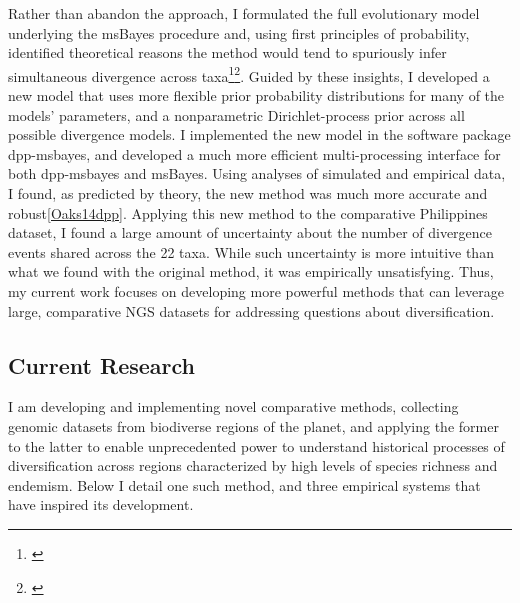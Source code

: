 Rather than abandon the approach, I formulated the full evolutionary model
underlying the msBayes procedure and, using first 
principles of probability, identified theoretical reasons the method
would tend to spuriously infer simultaneous divergence across
taxa\footnote{\label{Oaks12}}\super{,}\footnote{\label{Oaks14reply}}.
Guided by these insights, I developed a new model that uses more flexible prior
probability distributions for many of the models' parameters, and a
nonparametric Dirichlet-process prior across all possible divergence models.
I implemented the new model in the software package dpp-msbayes, and developed
a much more efficient multi-processing interface for both dpp-msbayes and
msBayes.
Using analyses of simulated and empirical data, I found, as predicted by
theory, the new method was much more accurate and robust\cref{Oaks14dpp}.
Applying this new method to the comparative Philippines dataset, I found a
large amount of uncertainty about the number of divergence events shared across
the 22 taxa.
While such uncertainty is more intuitive than what we found with the original
method, it was empirically unsatisfying.
Thus, my current work focuses on developing more powerful methods that can
leverage large, comparative NGS datasets for addressing questions about
diversification.


\subsection*{Current Research}
I am developing and implementing novel comparative methods, collecting genomic
datasets from biodiverse regions of the planet, and applying the former to the
latter to enable unprecedented power to understand historical processes of
diversification across regions characterized by high levels of species richness
and endemism.  Below I detail one such method, and three empirical systems that
have inspired its development.

